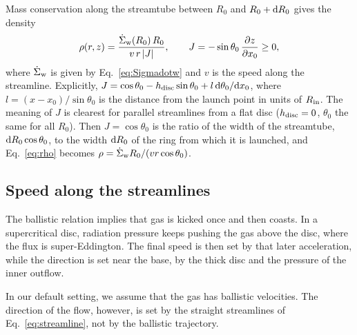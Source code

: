 
Mass conservation along the streamtube between $R_0$ and $R_0 + {\rm d}R_0$ gives the density
\begin{equation}
\rho(r, z) = \frac{\dot\Sigma_{\rm w}(R_0)\,R_0}{v\,r\,|J|},
\qquad
J = -\sin\theta_0\,\frac{\partial z}{\partial x_0} \ge 0 ,
\label{eq:rho}
\end{equation}
where $\dot\Sigma_{\rm w}$ is given by Eq.~\eqref{eq:Sigmadotw} and $v$ is the speed along the streamline.
Explicitly, $J = \cos\theta_0 - h_{\rm disc}\sin\theta_0 + l\,{\rm d}\theta_0/{\rm d}x_0$, where $l = (x - x_0)/\sin\theta_0$ is the distance from the launch point in units of $R_{\rm in}$.
The meaning of $J$ is clearest for parallel streamlines from a flat disc ($h_{\rm disc} = 0$, $\theta_0$ the same for all $R_0$).
Then $J = \cos\theta_0$ is the ratio of the width of the streamtube, ${\rm d}R_0\cos\theta_0$, to the width ${\rm d}R_0$ of the ring from which it is launched, and Eq.~\eqref{eq:rho} becomes $\rho = \dot\Sigma_{\rm w}R_0/(v r\cos\theta_0)$.

\subsection{Speed along the streamlines}
\label{sec:wind:velocity}

The ballistic relation implies that  gas is kicked once and then coasts.
In a supercritical disc, radiation pressure keeps pushing the gas above the disc, where the flux is super-Eddington.
The final speed is then set by that later acceleration, while the direction is set near the base, by the thick disc and the pressure of the inner outflow.

In our default setting, we assume that the gas has ballistic velocities. The direction of the flow, however, is set by the straight streamlines of Eq.~\eqref{eq:streamline}, not by the ballistic trajectory.

